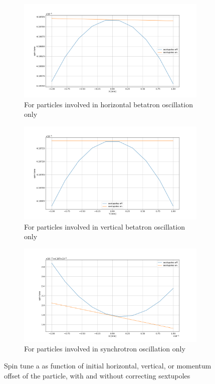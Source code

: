 \documentclass[a4paper]{jacow}
\begin{document}
\begin{figure}
  \centering
  \begin{subfigure}{\linewidth}
    \centering
    \includegraphics[width=\linewidth]{../img/IPAC19/spin_tune_decoh_x_offset}
    \caption{For particles involved in horizontal betatron oscillation only\label{fig:st_decoh_horizontal}}
  \end{subfigure}
  \begin{subfigure}{\linewidth}
    \centering
    \includegraphics[width=\linewidth]{../img/IPAC19/spin_tune_decoh_y_offset}
    \caption{For particles involved in vertical betatron oscillation only}
  \end{subfigure}
  \begin{subfigure}{\linewidth}
    \centering
    \includegraphics[width=\linewidth]{../img/IPAC19/spin_tune_decoh_d_offset}
    \caption{For particles involved in synchrotron oscillation only\label{fig:st_decoh_synchrotron}}
  \end{subfigure}
  \caption{Spin tune a as function of initial horizontal, vertical, or momentum offset of the particle, with and without correcting sextupoles\label{fig:decoherence_suppression_sim}}
\end{figure}
\end{document}
